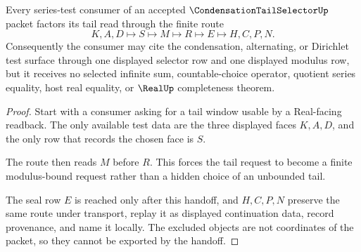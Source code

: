\begin{theorem}
\label{thm:condensation-tail-selector-test-handoff}
Every series-test consumer of an accepted $\CondensationTailSelectorUp$ packet factors its tail read through the finite route
$$
K,A,D\longmapsto S\longmapsto M\longmapsto R\longmapsto E\longmapsto H,C,P,N .
$$
Consequently the consumer may cite the condensation, alternating, or Dirichlet test surface through one displayed selector row and one displayed modulus row, but it receives no selected infinite sum, countable-choice operator, quotient series equality, host real equality, or $\RealUp$ completeness theorem.
\end{theorem}
\begin{proof}
Start with a consumer asking for a tail window usable by a Real-facing readback. The only available test data are the three displayed faces $K,A,D$, and the only row that records the chosen face is $S$.

The route then reads $M$ before $R$. This forces the tail request to become a finite modulus-bound request rather than a hidden choice of an unbounded tail.

The seal row $E$ is reached only after this handoff, and $H,C,P,N$ preserve the same route under transport, replay it as displayed continuation data, record provenance, and name it locally. The excluded objects are not coordinates of the packet, so they cannot be exported by the handoff.
\end{proof}




